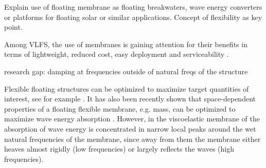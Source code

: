 \begin{itemize}
    {\color{red}\item Explain use of floating membrane as floating breakwaters, wave energy converters or platforms for floating solar or similar applications. Concept of flexibility as key point.}
    Among VLFS, the use of membranes is gaining attention for their benefits in terms of lightweight, reduced cost, easy deployment and serviceability \cite{zhang2022review,koley2022performance}. 

    {\color{red}
    \item research gap: damping at frequencies outside of natural freqs of the structure}
    Flexible floating structures can be optimized to maximize target quantities of interest, see for example \cite{yao2025optimization,michailides2015optimization}. It has also been recently shown that space-dependent properties of a floating flexible membrane, e.g. mass, can be optimized to maximize wave energy absorption \cite{el4911089optimization}. However, in the viscoelastic membrane of \cite{agarwal2024dynamic} the absorption of wave energy is concentrated in narrow local peaks around the wet natural frequencies of the membrane, since away from them the membrane either heaves almost rigidly (low frequencies) or largely reflects the waves (high frequencies).



\end{itemize}
